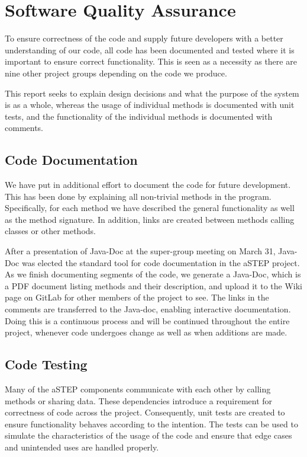 \section{Software Quality Assurance}\label{sec:unit_test}
To ensure correctness of the code and supply future developers with a better understanding of our code, all code has been documented and tested where it is important to ensure correct functionality. This is seen as a necessity as there are nine other project groups depending on the code we produce.

This report seeks to explain design decisions and what the purpose of the system is as a whole, whereas the usage of individual methods is documented with unit tests, and the functionality of the individual methods is documented with comments.

\subsection{Code Documentation} \label{sec:code_documentation}
We have put in additional effort to document the code for future development. This has been done by explaining all non-trivial methods in the program. Specifically, for each method we have described the general functionality as well as the method signature. In addition, links are created between methods calling classes or other methods. 

After a presentation of Java-Doc at the super-group meeting on March 31, Java-Doc was elected the standard tool for code documentation in the aSTEP project.
As we finish documenting segments of the code, we generate a Java-Doc, which is a PDF document listing methods and their description, and upload it to the Wiki page \cite{dokumentation_astep} on GitLab for other members of the project to see. The links in the comments are transferred to the Java-doc, enabling interactive documentation. 
Doing this is a continuous process and will be continued throughout the entire project, whenever code undergoes change as well as when additions are made.

\subsection{Code Testing}
Many of the aSTEP components communicate with each other by calling methods or sharing data. These dependencies introduce a requirement for correctness of code across the project. Consequently, unit tests are created to ensure functionality behaves according to the intention. The tests can be used to simulate the characteristics of the usage of the code and ensure that edge cases and unintended uses are handled properly. 

